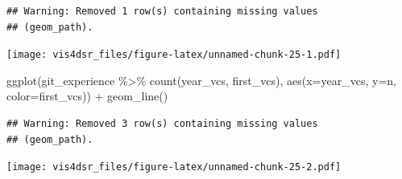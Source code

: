 \documentclass[
]{krantz}
\makeatletter
\newenvironment{Shaded}{\begin{snugshade}}{\end{snugshade}}
\newcommand{\AttributeTok}[1]{\textcolor[rgb]{0.61,0.61,0.61}{#1}}
\newcommand{\FunctionTok}[1]{\textcolor[rgb]{0,0,0}{#1}}
\newcommand{\NormalTok}[1]{#1}
\newcommand{\SpecialCharTok}[1]{\textcolor[rgb]{0,0,0}{#1}}
\newenvironment{kframe}{%
\medskip{}
\setlength{\fboxsep}{.8em}
 \def\at@end@of@kframe{}%
 \ifinner\ifhmode%
  \def\at@end@of@kframe{\end{minipage}}%
  \begin{minipage}{\columnwidth}%
 \fi\fi%
 \def\FrameCommand##1{\hskip\@totalleftmargin \hskip-\fboxsep
 \colorbox{shadecolor}{##1}\hskip-\fboxsep
     \hskip-\linewidth \hskip-\@totalleftmargin \hskip\columnwidth}%
 \MakeFramed {\advance\hsize-\width
   \@totalleftmargin\z@ \linewidth\hsize
   \@setminipage}}%
 {\par\unskip\endMakeFramed%
 \at@end@of@kframe}
\renewenvironment{Shaded}{\begin{kframe}}{\end{kframe}}
\makeatother
\begin{document}
\begin{verbatim}
## Warning: Removed 1 row(s) containing missing values
## (geom_path).
\end{verbatim}

\texttt{[image: vis4dsr\_files/figure-latex/unnamed-chunk-25-1.pdf]}

\begin{Shaded}
\begin{Highlighting}[]
\FunctionTok{ggplot}\NormalTok{(git\_experience }\SpecialCharTok{\%\textgreater{}\%} \FunctionTok{count}\NormalTok{(year\_vcs, first\_vcs), }\FunctionTok{aes}\NormalTok{(}\AttributeTok{x=}\NormalTok{year\_vcs, }\AttributeTok{y=}\NormalTok{n, }\AttributeTok{color=}\NormalTok{first\_vcs)) }\SpecialCharTok{+}
  \FunctionTok{geom\_line}\NormalTok{()}
\end{Highlighting}
\end{Shaded}

\begin{verbatim}
## Warning: Removed 3 row(s) containing missing values
## (geom_path).
\end{verbatim}

\texttt{[image: vis4dsr\_files/figure-latex/unnamed-chunk-25-2.pdf]}
\end{document}
